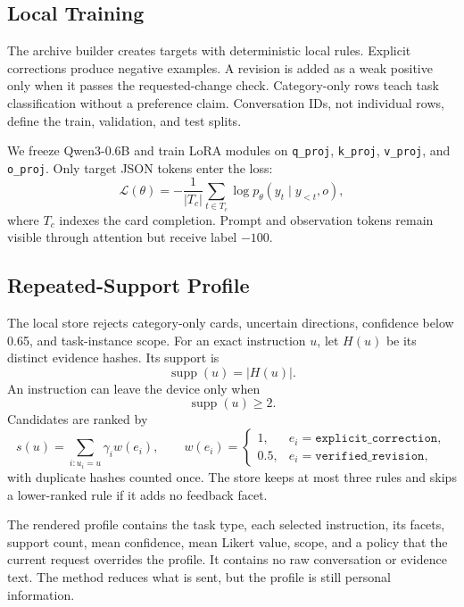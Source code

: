 \documentclass{article}
\begin{document}
\subsection{Local Training}

The archive builder creates targets with deterministic local rules. Explicit
corrections produce negative examples. A revision is added as a weak positive
only when it passes the requested-change check. Category-only rows teach task
classification without a preference claim. Conversation IDs, not individual
rows, define the train, validation, and test splits.

We freeze Qwen3-0.6B \citep{yang2025qwen3tr} and train LoRA modules
\citep{hu2022lora} on \texttt{q\_proj}, \texttt{k\_proj},
\texttt{v\_proj}, and \texttt{o\_proj}. Only target JSON tokens enter the
loss:
\begin{equation}
\mathcal{L}(\theta)
=-\frac{1}{|T_c|}\sum_{t\in T_c}
\log p_\theta(y_t\mid y_{<t},o),
\label{eq:sft}
\end{equation}
where $T_c$ indexes the card completion. Prompt and observation tokens remain
visible through attention but receive label $-100$.

\subsection{Repeated-Support Profile}

The local store rejects category-only cards, uncertain directions, confidence
below 0.65, and task-instance scope. For an exact instruction $u$, let $H(u)$
be its distinct evidence hashes. Its support is
\[
\operatorname{supp}(u)=|H(u)|.
\]
An instruction can leave the device only when
\begin{equation}
\operatorname{supp}(u)\geq 2.
\label{eq:support}
\end{equation}
Candidates are ranked by
\begin{equation}
s(u)=\sum_{i:u_i=u}\gamma_i w(e_i), \qquad
w(e_i)=
\begin{cases}
1,&e_i=\texttt{explicit\_correction},\\
0.5,&e_i=\texttt{verified\_revision},
\end{cases}
\label{eq:rank}
\end{equation}
with duplicate hashes counted once. The store keeps at most three rules and
skips a lower-ranked rule if it adds no feedback facet.

The rendered profile contains the task type, each selected instruction, its
facets, support count, mean confidence, mean Likert value, scope, and a policy
that the current request overrides the profile. It contains no raw
conversation or evidence text. The method reduces what is sent, but the profile
is still personal information.
\end{document}
